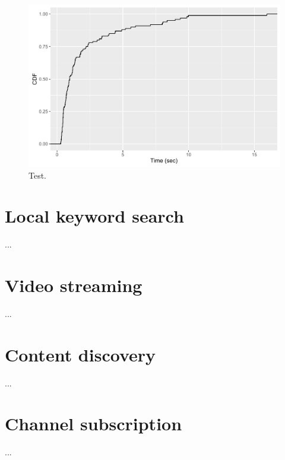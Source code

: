 \begin{figure}[!h]
	\centering
	\includegraphics[width=0.6\columnwidth]{images/experiments/cdf_remote_search_all_results}
	\caption{Test.}
	\label{fig:remote_search_all_result}
\end{figure}

\section{Local keyword search}
...

\section{Video streaming}
...

\section{Content discovery}
...

\section{Channel subscription}
...

